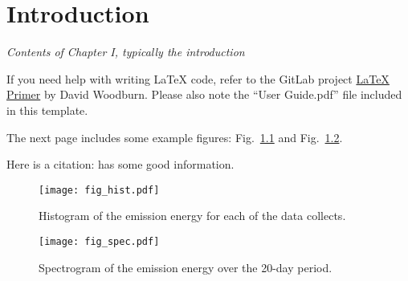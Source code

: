 \chapter{Introduction}

\emph{Contents of Chapter I, typically the introduction}

If you need help with writing \LaTeX{} code, refer to the GitLab project
\href{https://gitlab.com/davidwoodburn/latex-primer}{\LaTeX{} Primer} by David
Woodburn. Please also note the ``User Guide.pdf'' file included in this template.

The next page includes some example figures: Fig.~\ref{fig:hist} and
Fig.~\ref{fig:spec}.

Here is a citation: \textcite{savage2000} has some good information.

\begin{figure}
    \centering
    \texttt{[image: fig\_hist.pdf]}
    \caption{Histogram of the emission energy for each of the data collects.}
    \label{fig:hist}
\end{figure}

\begin{figure}
    \centering
    \texttt{[image: fig\_spec.pdf]}
    \caption{Spectrogram of the emission energy over the 20-day period.}
    \label{fig:spec}
\end{figure}